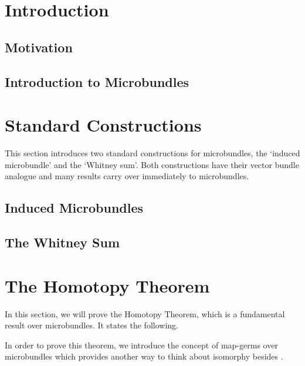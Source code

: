 \documentclass{article}
\begin{document}


\tableofcontents
\clearpage
\section{Introduction}\label{chapter::introduction}
\subsection*{Motivation}\label{section::motivation}

\subsection*{Introduction to Microbundles}\label{section::microbundle}

\section{Standard Constructions}\label{chapter::constructions}
\begin{myparagraph}
This section introduces two standard constructions for microbundles, the `induced microbundle' and the `Whitney sum'. Both constructions have their vector bundle analogue and many results carry over immediately to microbundles.
\end{myparagraph}
\subsection*{Induced Microbundles}\label{section::induced}

\subsection*{The Whitney Sum}\label{section::whitney}

\section{The Homotopy Theorem}\label{chapter::homotopy}
\begin{myparagraph}
In this section, we will prove the Homotopy Theorem, which is a fundamental result over microbundles. It states the following.
\end{myparagraph}

\begin{myparagraph}
In order to prove this theorem, we introduce the concept of map-germs over microbundles which provides another way to think about isomorphy besides .
\end{myparagraph}


\end{document}
